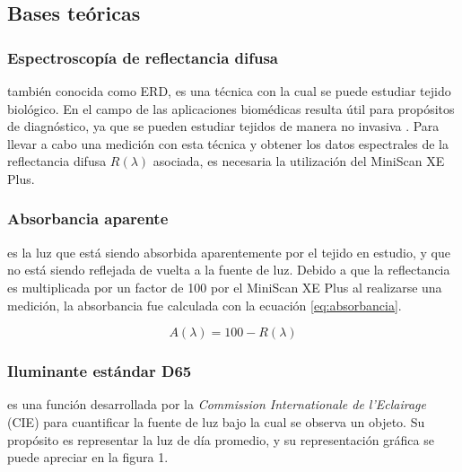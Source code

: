 \documentclass[conference]{IEEEtran}
\begin{document}
	\subsection{Bases te\'{o}ricas}
	
		\subsubsection{Espectroscop\'{i}a de reflectancia difusa}
		tambi\'{e}n conocida como ERD, es una t\'{e}cnica con la cual se puede estudiar tejido biol\'{o}gico. En el campo de las aplicaciones biom\'{e}dicas resulta \'{u}til para prop\'{o}sitos de diagn\'{o}stico, ya que se pueden estudiar tejidos de manera no invasiva \cite{Perez}. Para llevar a cabo una medici\'{o}n con esta t\'{e}cnica y obtener los datos espectrales de la reflectancia difusa $R(\lambda)$ asociada, es necesaria la utilizaci\'{o}n del MiniScan XE Plus.
		
		\subsubsection{Absorbancia aparente}
		
		es la luz que est\'{a} siendo absorbida aparentemente por el tejido en estudio, y que no est\'{a} siendo reflejada de vuelta a la fuente de luz. Debido a que la reflectancia es multiplicada por un factor de 100 por el MiniScan XE Plus al realizarse una medici\'{o}n, la absorbancia fue calculada con la ecuaci\'{o}n \ref{eq:absorbancia}.
	
\begin{equation}\label{eq:absorbancia}
	A(\lambda) = 100 - R(\lambda)
\end{equation}
		
		\subsubsection{Iluminante est\'{a}ndar D65}
		
		es una funci\'{o}n desarrollada por la \textit{Commission Internationale de l'Eclairage} (CIE) \cite{CIE-report} para cuantificar la fuente de luz bajo la cual se observa un objeto. Su prop\'{o}sito es representar la luz de d\'{i}a promedio, y su representaci\'{o}n gr\'{a}fica se puede apreciar en la figura 1.
		
\FloatBarrier
\end{document}
